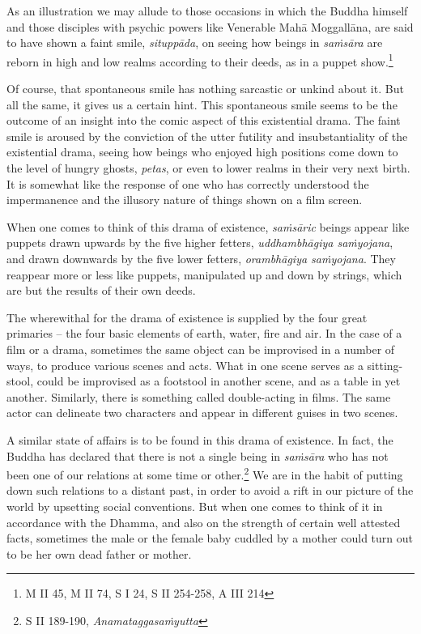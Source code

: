 As an illustration we may allude to those occasions in which the Buddha himself and those disciples with psychic powers like Venerable Mahā Moggallāna, are said to have shown a faint smile, \emph{situppāda}, on seeing how beings in \emph{saṁsāra} are reborn in high and low realms according to their deeds, as in a puppet show.\footnote{M II 45, M II 74, S I 24, S II 254-258, A III 214}

Of course, that spontaneous smile has nothing sarcastic or unkind about it. But all the same, it gives us a certain hint. This spontaneous smile seems to be the outcome of an insight into the comic aspect of this existential drama. The faint smile is aroused by the conviction of the utter futility and insubstantiality of the existential drama, seeing how beings who enjoyed high positions come down to the level of hungry ghosts, \emph{petas}, or even to lower realms in their very next birth. It is somewhat like the response of one who has correctly understood the impermanence and the illusory nature of things shown on a film screen.

When one comes to think of this drama of existence, \emph{saṁsāric} beings appear like puppets drawn upwards by the five higher fetters, \emph{uddhambhāgiya saṁyojana}, and drawn downwards by the five lower fetters, \emph{orambhāgiya saṁyojana}. They reappear more or less like puppets, manipulated up and down by strings, which are but the results of their own deeds.

The wherewithal for the drama of existence is supplied by the four great primaries -- the four basic elements of earth, water, fire and air. In the case of a film or a drama, sometimes the same object can be improvised in a number of ways, to produce various scenes and acts. What in one scene serves as a sitting-stool, could be improvised as a footstool in another scene, and as a table in yet another. Similarly, there is something called double-acting in films. The same actor can delineate two characters and appear in different guises in two scenes.

A similar state of affairs is to be found in this drama of existence. In fact, the Buddha has declared that there is not a single being in \emph{saṁsāra} who has not been one of our relations at some time or other.\footnote{S II 189-190, \emph{Anamataggasaṁyutta}} We are in the habit of putting down such relations to a distant past, in order to avoid a rift in our picture of the world by upsetting social conventions. But when one comes to think of it in accordance with the Dhamma, and also on the strength of certain well attested facts, sometimes the male or the female baby cuddled by a mother could turn out to be her own dead father or mother.

